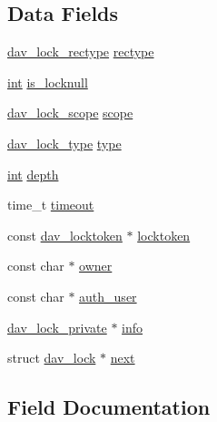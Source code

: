 \subsection*{Data Fields}
\begin{DoxyCompactItemize}
\item 
\hyperlink{group__MOD__DAV_ga35626623c09f0611245743b5868eb936}{dav\+\_\+lock\+\_\+rectype} \hyperlink{structdav__lock_afb2fa572c2476c5277369684d455b82f}{rectype}
\item 
\hyperlink{pcre_8txt_a42dfa4ff673c82d8efe7144098fbc198}{int} \hyperlink{structdav__lock_a4784c04d6e4795b75cecede0470afddb}{is\+\_\+locknull}
\item 
\hyperlink{group__MOD__DAV_ga4840019bf9343c4c1a95befb97b12a88}{dav\+\_\+lock\+\_\+scope} \hyperlink{structdav__lock_a8ba66b35529c414fed105e134f14ee3d}{scope}
\item 
\hyperlink{group__MOD__DAV_ga9089e677b6d1b25daccbc1efa484a829}{dav\+\_\+lock\+\_\+type} \hyperlink{structdav__lock_a4aa3e9701a82c81261524a82dc6e7416}{type}
\item 
\hyperlink{pcre_8txt_a42dfa4ff673c82d8efe7144098fbc198}{int} \hyperlink{structdav__lock_a5bb85bc71ec6944b0f93c9b7b80877ae}{depth}
\item 
time\+\_\+t \hyperlink{structdav__lock_a03cbe5184a1fb4a732c41180dee9f669}{timeout}
\item 
const \hyperlink{structdav__locktoken}{dav\+\_\+locktoken} $\ast$ \hyperlink{structdav__lock_a5ba4dd1e2e44354d831fc83099b56a37}{locktoken}
\item 
const char $\ast$ \hyperlink{structdav__lock_ae78ed4ddbc46974c039442c376f84167}{owner}
\item 
const char $\ast$ \hyperlink{structdav__lock_a109abbfc333fac81ae0efb15797b474a}{auth\+\_\+user}
\item 
\hyperlink{structdav__lock__private}{dav\+\_\+lock\+\_\+private} $\ast$ \hyperlink{structdav__lock_af44ee5be5aa2545cc845667939c2277f}{info}
\item 
struct \hyperlink{structdav__lock}{dav\+\_\+lock} $\ast$ \hyperlink{structdav__lock_a66477789d4e9ff6e7c5b50c334805b85}{next}
\end{DoxyCompactItemize}


\subsection{Field Documentation}
